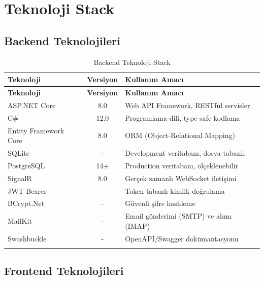 \documentclass[12pt,a4paper]{article}
\begin{document}
\section{Teknoloji Stack}

\subsection{Backend Teknolojileri}

\begin{longtable}{|l|c|p{7cm}|}
\hline
\textbf{Teknoloji} & \textbf{Versiyon} & \textbf{Kullanım Amacı} \\
\hline
\endfirsthead
\hline
\textbf{Teknoloji} & \textbf{Versiyon} & \textbf{Kullanım Amacı} \\
\hline
\endhead
ASP.NET Core & 8.0 & Web API Framework, RESTful servisler \\
\hline
C\# & 12.0 & Programlama dili, type-safe kodlama \\
\hline
Entity Framework Core & 8.0 & ORM (Object-Relational Mapping) \\
\hline
SQLite & - & Development veritabanı, dosya tabanlı \\
\hline
PostgreSQL & 14+ & Production veritabanı, ölçeklenebilir \\
\hline
SignalR & 8.0 & Gerçek zamanlı WebSocket iletişimi \\
\hline
JWT Bearer & - & Token tabanlı kimlik doğrulama \\
\hline
BCrypt.Net & - & Güvenli şifre hashleme \\
\hline
MailKit & - & Email gönderimi (SMTP) ve alımı (IMAP) \\
\hline
Swashbuckle & - & OpenAPI/Swagger dokümantasyonu \\
\hline
\caption{Backend Teknoloji Stack}
\end{longtable}

\subsection{Frontend Teknolojileri}
\end{document}
